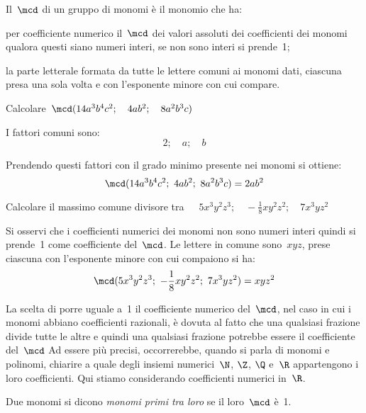 \begin{procedura}

Il~$\mcd$ di un gruppo di monomi è il monomio che ha:

\begin{enumeratea}
 \item per coefficiente numerico il~$\mcd$ dei valori assoluti dei
coefficienti dei monomi qualora
questi siano numeri interi, se non sono interi si prende~1;
 \item la parte letterale formata da tutte le lettere comuni ai monomi
dati, ciascuna presa una sola volta e con l'esponente minore con cui 
compare.
\end{enumeratea}
\end{procedura}

\begin{exrig}
 \begin{esempio}
Calcolare~$\mcd (14a^{3}b^{4}c^{2}; \quad 4ab^{2}; \quad 8a^{2}b^{3}c)$ 

I fattori comuni sono:
\[2; \quad a; \quad b\]

Prendendo questi fattori con il grado minimo presente nei monomi 
si ottiene:
\[\mcd(14a^{3}b^{4}c^{2};~4ab^{2};~8a^{2}b^{3}c)=2ab^{2}\]
 \end{esempio}

 \begin{esempio}
Calcolare il massimo comune divisore 
tra~$\quad 5x^{3}y^{2}z^{3}; \quad -\frac{1}{8}xy^{2}z^{2}; 
     \quad 7x^{3}yz^{2}$

Si osservi che i coefficienti numerici dei monomi non sono numeri interi
quindi si prende~1 come coefficiente del~$\mcd$.
Le lettere in comune sono~$xyz$, prese ciascuna con
l'esponente minore con cui compaiono si ha:
\[\mcd(5x^{3}y^{2}z^{3};~-\frac{1}{8}xy^{2}z^{2};~7x^{3}yz^{2})=xyz^{2}\]
 \end{esempio}
\end{exrig}

\osservazione La scelta di porre uguale a~1 il coefficiente numerico 
del~$\mcd$, nel
caso in cui i monomi abbiano coefficienti razionali, è dovuta al
fatto che una qualsiasi frazione divide tutte le altre e quindi una
qualsiasi frazione potrebbe essere il coefficiente del~$\mcd$ Ad essere
più precisi, occorrerebbe, quando si parla di monomi e polinomi,
chiarire a quale degli insiemi numerici~$\N$, $\Z$, $\Q$ e~$\R$ 
appartengono i loro coefficienti. Qui stiamo considerando coefficienti 
numerici in~$\R$.

\begin{definizione}
 Due monomi si dicono \emph{monomi primi tra loro} se il loro~$\mcd$ è~1.
\end{definizione}

